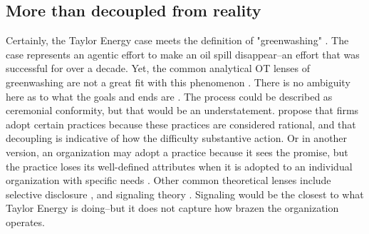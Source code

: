 
\subsection*{More than decoupled from reality}\label{sec:lit}

Certainly, the Taylor Energy case meets the definition of "greenwashing" \citep{Lyon2015}. The case represents an agentic effort to make an oil spill disappear--an effort that was successful for over a decade. Yet, the common analytical OT lenses of greenwashing are not a great fit with this phenomenon \citep{Delmas2011}. There is no ambiguity here as to what the goals and ends are \citep{Crilly2012,Bromley2012,Wijen2014}. The process could be described as ceremonial conformity, but that would be an understatement. \citet{Meyer1977} propose that firms adopt certain practices because these practices are considered rational, and that decoupling is indicative of how the difficulty substantive action. Or in another version, an organization may adopt a practice because it sees the promise, but the practice loses its well-defined attributes when it is adopted to an individual organization with specific needs \citep{Zbaracki1998}. Other common theoretical lenses include selective disclosure \citep{Lyon2011}, and signaling theory \citep{Delmas2010}. Signaling would be the closest to what Taylor Energy is doing--but it does not capture how brazen the organization operates.
